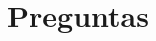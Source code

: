 \documentclass{beamer}
\begin{document}
%
%
%
%
%
%
%
%
%
%
%
%
%
%
%
%
%
%
%
%
%
%
%
%
%
%


\section{Preguntas}
\end{document}
